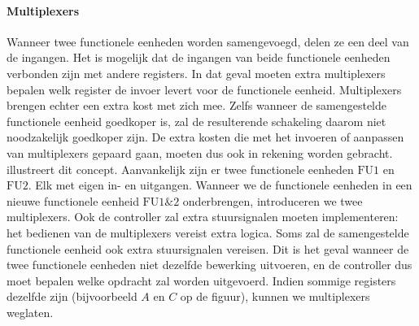\paragraph{Multiplexers}
Wanneer twee functionele eenheden worden samengevoegd, delen ze een deel van de ingangen. Het is mogelijk dat de ingangen van beide functionele eenheden verbonden zijn met andere registers. In dat geval moeten extra multiplexers bepalen welk register de invoer levert voor de functionele eenheid. Multiplexers brengen echter een extra kost met zich mee. Zelfs wanneer de samengestelde functionele eenheid goedkoper is, zal de resulterende schakeling daarom niet noodzakelijk goedkoper zijn. De extra kosten die met het invoeren of aanpassen van multiplexers gepaard gaan, moeten dus ook in rekening worden gebracht.  illustreert dit concept. Aanvankelijk zijn er twee functionele eenheden $\mbox{FU1}$ en $\mbox{FU2}$. Elk met eigen in- en uitgangen. Wanneer we de functionele eenheden in een nieuwe functionele eenheid $\mbox{FU1\&2}$ onderbrengen, introduceren we twee multiplexers. Ook de controller zal extra stuursignalen moeten implementeren: het bedienen van de multiplexers vereist extra logica. Soms zal de samengestelde functionele eenheid ook extra stuursignalen vereisen. Dit is het geval wanneer de twee functionele eenheden niet dezelfde bewerking uitvoeren, en de controller dus moet bepalen welke opdracht zal worden uitgevoerd. Indien sommige registers dezelfde zijn (bijvoorbeeld $A$ en $C$ op de figuur), kunnen we multiplexers weglaten.
